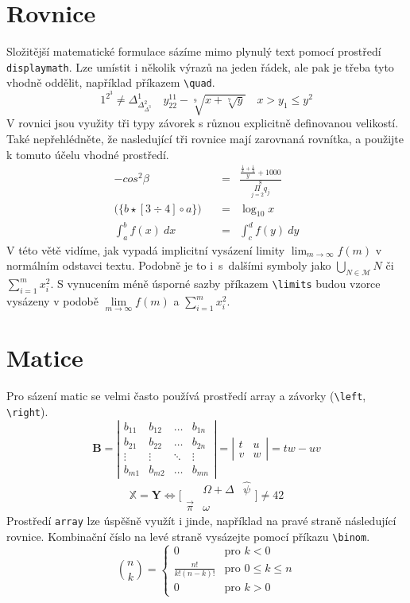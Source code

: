 \documentclass[a4paper, twocolumn, 11pt]{article}
\begin{document}
\section{Rovnice}
Složitější matematické formulace sázíme mimo plynulý text pomocí prostředí \texttt{displaymath}. Lze umístit i několik výrazů na jeden řádek, ale pak je třeba tyto vhodně oddělit, například příkazem \verb|\quad|. 
$$
1^{2^3} \neq \Delta_{\Delta_{\Delta^3}^2}^1 \quad y_{22}^{11}-\sqrt[9]{x+\sqrt[7]{y}} \quad x>y_1\leq y^2
$$
V rovnici jsou využity tři typy závorek s různou explicitně definovanou velikostí. Také nepřehlédněte, že nasledující tři rovnice mají zarovnaná rovnítka, a použijte k tomuto účelu vhodné prostředí. 
\begin{eqnarray}
-cos^2\beta &=& \frac{\frac{\frac{1}{x}+\frac{1}{3}}{y}+1000}{\overset{8}{\underset{j=2}{\Pi}q_j}} \\
\bigg(\Big \{ b \star [3 \div 4 ]\circ a \Big \} \bigg) \quad &=& \log_{10} x \\
\int_{a}^b f(x)\ dx &=& \int_{c}^d f(y)\ dy
\end{eqnarray}
V této větě vidíme, jak vypadá implicitní vysázení limity $\lim_{m\rightarrow\infty}f(m)$ v normálním odstavci textu. Podobně je to i~s~dalšími symboly jako $\bigcup_{N\in \mathcal{M}} N$ či $\sum_{i=1}^m x_{i}^2$. S vynucením méně úsporné sazby příkazem \verb|\limits| budou vzorce vysázeny v podobě $\lim\limits_{m\rightarrow\infty}f(m)$ a $\sum\limits_{i=1}^m x_{i}^2$.

\section{Matice}
Pro sázení matic se velmi často používá prostředí array a závorky (\verb|\left|, \verb|\right|). 
$$
\mathbf{B}=\left|\begin{array}{cccc}
b_{11} & b_{12} & \ldots & b_{1 n} \\
b_{21} & b_{22} & \ldots & b_{2 n} \\
\vdots & \vdots & \ddots & \vdots \\
b_{m 1} & b_{m 2} & \ldots & b_{m n}
\end{array}\right|=\left|\begin{array}{cc}
t & u \\
v & w
\end{array}\right|=t w-u v
$$
$$
\mathbb X = \mathbf {Y} \Longleftrightarrow \bigg [ \begin{array}{ccc}
     & \Omega +\Delta & \hat{\psi}  \\
  \vec{\pi}   &  \omega
\end{array}\bigg ] \neq 42
$$
Prostředí \texttt{array} lze úspěšně využít i jinde, například na pravé straně následující rovnice. Kombinační číslo na levé straně vysázejte pomocí příkazu \verb|\binom|.
$$
\binom{n}{k}=\left\{\begin{array}{cl}
0 & \text {pro } k < 0 \\
\frac{n !}{k !(n-k) !} & \text {pro } 0 \leq k \leq n \\
0 & \text {pro } k>0 
\end{array}\right.
$$
\label{rovnice}
\end{document}
